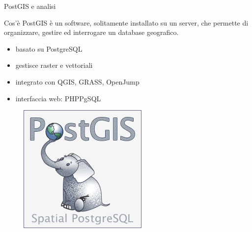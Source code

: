 \documentclass{beamer}
\begin{document}
		\begin{frame}{PostGIS e analisi}
			\begin{block}{Cos'è}
				PostGIS è un software, solitamente installato su un server, che permette di organizzare, gestire ed interrogare un database geografico.
			\end{block}
			\begin{multicols}{2}[][]
				\begin{itemize}
					\item basato su PostgreSQL
					\item gestisce raster e vettoriali
					\item integrato con QGIS, GRASS, OpenJump
					\item interfaccia web: PHPPgSQL
				\end{itemize}
				\columnbreak
				\begin{figure}[]
					\begin{center}
						\includegraphics[width=1\linewidth]{sw_logos/pg}
					\end{center}
					\label{fig:pg_logo}
				\end{figure}
			\end{multicols}
		\end{frame}
\end{document}
